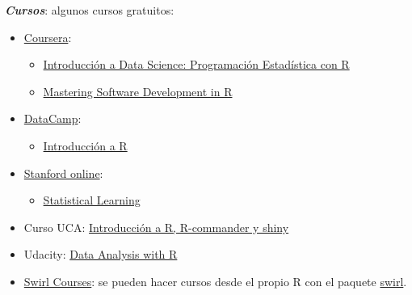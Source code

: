 \documentclass[]{book}
\providecommand{\tightlist}{%
  \setlength{\itemsep}{0pt}\setlength{\parskip}{0pt}}
\begin{document}
\textbf{\emph{Cursos}}:
algunos cursos gratuitos:

\begin{itemize}
\item
  \href{https://www.coursera.org/}{Coursera}:

  \begin{itemize}
  \item
    \href{https://www.coursera.org/learn/intro-data-science-programacion-estadistica-r}{Introducción a Data Science: Programación Estadística con R}
  \item
    \href{https://www.coursera.org/specializations/r}{Mastering Software Development in R}
  \end{itemize}
\end{itemize}

\begin{itemize}
\item
  \href{https://www.datacamp.com/courses}{DataCamp}:

  \begin{itemize}
  \tightlist
  \item
    \href{https://www.datacamp.com/courses/introduccion-a-r/}{Introducción a R}
  \end{itemize}
\end{itemize}

\begin{itemize}
\item
  \href{http://online.stanford.edu/courses}{Stanford online}:

  \begin{itemize}
  \tightlist
  \item
    \href{http://online.stanford.edu/course/statistical-learning}{Statistical Learning}
  \end{itemize}
\end{itemize}

\begin{itemize}
\tightlist
\item
  Curso UCA: \href{http://knuth.uca.es/moodle/course/view.php?id=51}{Introducción a R, R-commander y shiny}
\end{itemize}

\begin{itemize}
\tightlist
\item
  Udacity: \href{https://eu.udacity.com/course/data-analysis-with-r--ud651}{Data Analysis with R}
\end{itemize}

\begin{itemize}
\tightlist
\item
  \href{https://swirlstats.com/scn/title.html}{Swirl Courses}:
  se pueden hacer cursos desde el propio R con el paquete
  \href{https://swirlstats.com}{swirl}.
\end{itemize}
\end{document}
